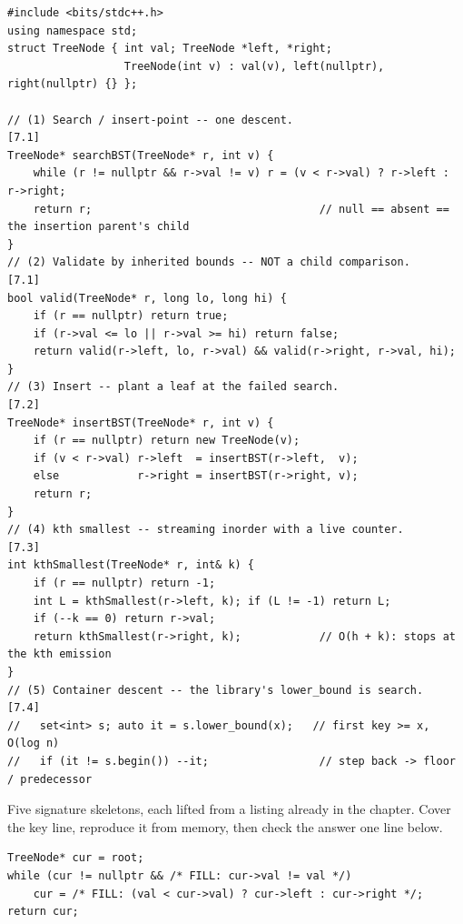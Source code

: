 \begin{lstlisting}[caption={Chapter 7 code kit: search, validate, insert, kth, container bound}, label={lst:c05-kit}]
#include <bits/stdc++.h>
using namespace std;
struct TreeNode { int val; TreeNode *left, *right;
                  TreeNode(int v) : val(v), left(nullptr), right(nullptr) {} };

// (1) Search / insert-point -- one descent.                        [7.1]
TreeNode* searchBST(TreeNode* r, int v) {
    while (r != nullptr && r->val != v) r = (v < r->val) ? r->left : r->right;
    return r;                                   // null == absent == the insertion parent's child
}
// (2) Validate by inherited bounds -- NOT a child comparison.      [7.1]
bool valid(TreeNode* r, long lo, long hi) {
    if (r == nullptr) return true;
    if (r->val <= lo || r->val >= hi) return false;
    return valid(r->left, lo, r->val) && valid(r->right, r->val, hi);
}
// (3) Insert -- plant a leaf at the failed search.                 [7.2]
TreeNode* insertBST(TreeNode* r, int v) {
    if (r == nullptr) return new TreeNode(v);
    if (v < r->val) r->left  = insertBST(r->left,  v);
    else            r->right = insertBST(r->right, v);
    return r;
}
// (4) kth smallest -- streaming inorder with a live counter.       [7.3]
int kthSmallest(TreeNode* r, int& k) {
    if (r == nullptr) return -1;
    int L = kthSmallest(r->left, k); if (L != -1) return L;
    if (--k == 0) return r->val;
    return kthSmallest(r->right, k);            // O(h + k): stops at the kth emission
}
// (5) Container descent -- the library's lower_bound is search.    [7.4]
//   set<int> s; auto it = s.lower_bound(x);   // first key >= x, O(log n)
//   if (it != s.begin()) --it;                 // step back -> floor / predecessor
\end{lstlisting}


Five signature skeletons, each lifted from a listing already in the chapter. Cover the key line,
reproduce it from memory, then check the answer one line below.

\begin{lstlisting}[caption={Drill 1 -- search descent (from \coderef{c05-search})}]
TreeNode* cur = root;
while (cur != nullptr && /* FILL: cur->val != val */)
    cur = /* FILL: (val < cur->val) ? cur->left : cur->right */;
return cur;
\end{lstlisting}

